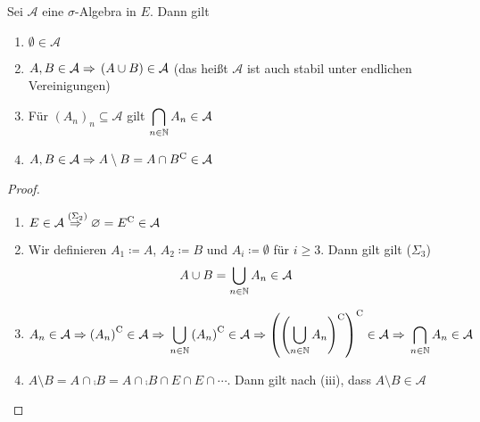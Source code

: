 \begin{lemma}
    Sei $\mathcal{A}$ eine $\sigma$-Algebra in $E$. Dann gilt
    \begin{enumerate}[label=(\roman*)]
        \item $\emptyset\in\mathcal{A}$
        \item $A, B\in\mathcal{A} \Rightarrow{} \left(A\cup B\right) \in\mathcal{A}$ (das heißt $\mathcal{A}$ ist auch stabil unter endlichen Vereinigungen)
        \item Für $(A_n)_n \subseteq \mathcal{A}$ gilt $\displaystyle\bigcap_{n\in\mathbb{N}} A_n \in\mathcal{A}$
        \item $A, B\in\mathcal{A} \Rightarrow{} A \setminus B = A \cap {B}^{\mathrm{C}} \in \mathcal{A}$
    \end{enumerate}

    \begin{proof}
        \theoremescape
        \begin{enumerate}[label=(\roman*)]
            \item $E\in\mathcal{A} \overset{(\Sigma_2)}{\Rightarrow{}} \varnothing = {E}^{\mathrm{C}} \in\mathcal{A}$
            \item Wir definieren $A_1 \coloneqq A$, $A_2 \coloneqq B$ und $A_i \coloneqq \emptyset$ für $i\geq 3$. Dann gilt gilt ($\Sigma_3$)
            \begin{align*}
                A \cup B &= \bigcup_{n\in\mathbb{N}} A_n \in \mathcal{A}
            \end{align*}
            \item $A_n \in \mathcal{A} \Rightarrow{} {\left(A_n\right)}^{\mathrm{C}} \in \mathcal{A} \Rightarrow{} \displaystyle\bigcup_{n\in\mathbb{N}} {\left(A_n\right)}^{\mathrm{C}} \in \mathcal{A} \Rightarrow{} {\left({\left(\bigcup_{n\in\mathbb{N}} A_n\right)}^{\mathrm{C}}\right)}^{\mathrm{C}} \in \mathcal{A} \Rightarrow{} \bigcap_{n\in\mathbb{N}} A_n\in\mathcal{A}$
            \item $A\setminus B = A \cap \comp{B} = A \cap \comp{B} \cap E \cap E \cap \cdots$. Dann gilt nach (iii), dass $A \setminus B \in\mathcal{A}$\qedhere
        \end{enumerate}
    \end{proof}
\end{lemma}

